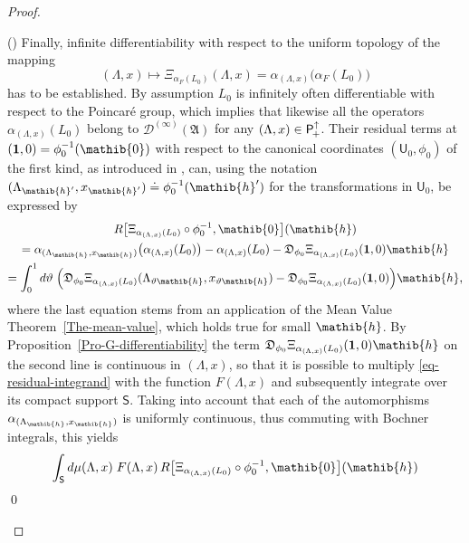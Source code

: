 \documentclass[11pt,twoside,openright]{report}
\theoremstyle{definition}
\theoremstyle{plain}
\theoremstyle{remark}
\theoremstyle{assumption}
\newcommand{\Afrak}{\mathfrak{A}}
\newcommand{\Dfrak}{\mathfrak{D}}
\newcommand{\zeroib}{\mathib{0}}
\newcommand{\hib}{\mathib{h}}
\newcommand{\Dscr}{\mathscr{D}}
\newcommand{\Ssf}{\mathsf{S}}
\newcommand{\Usf}{\mathsf{U}}
\newcommand{\unit}{\mathbf{1}}
\newcommand{\Poin}{\mathsf{P}_{\negthinspace +}^\uparrow}
\newcommand{\aLax}{\alpha_{( \Lambda , x )}}
\newcounter{proofitem}
\newenvironment{prooflist}{\begin{list}{(\roman{proofitem})}%
  {\usecounter{proofitem} \setlength{\topsep}{0ex}%
   \setlength{\parsep}{0.2ex} \setlength{\itemsep}{0.4ex}%
   \setlength{\leftmargin}{0em} \setlength{\itemindent}{0.5em}%
   \setlength{\listparindent}{1em}}}{\qed \end{list}}
\begin{document}
\begin{proof}
\begin{prooflist}
    Finally, infinite differentiability with respect to the uniform
    topology of the mapping
    \begin{equation*}
      ( \Lambda , x ) \mapsto \Xi_{\alpha_F ( L_0 )} ( \Lambda , x ) =
      \aLax \bigl( \alpha_F ( L_0 ) \bigr)
    \end{equation*}
    has to be established. By assumption $L_0$ is infinitely often
    differentiable with respect to the Poincar\'{e} group, which
    implies that likewise all the operators $\aLax ( L_0 )$ belong to
    $\Dscr^{( \infty )} ( \Afrak )$ for any $( \Lambda , x ) \in
    \Poin$. Their residual terms at $( \unit ,  0 ) = \phi_0^{-1} (
    \zeroib )$ with respect to the canonical coordinates $( \Usf_0 ,
    \phi_0 )$ of the first kind, as introduced in
    \cite[Section~2.10]{varadarajan:1984}, can, using the notation $(
    \Lambda_{\hib'} , x_{\hib'} ) \doteq \phi_0^{-1} ( \hib' )$ for
    the transformations in $\Usf_0$, be expressed by
    \begin{multline}
      \label{eq-residual-integrand}
      R \bigl[ \Xi_{\aLax ( L_0 )} \circ \phi_0^{-1} , \zeroib \bigr]
      ( \hib ) \\
      = \alpha_{( \Lambda_\hib , x_\hib )} \bigl( \aLax ( L_0 ) \bigr)
      - \aLax ( L_0 ) - \Dfrak_{\phi_0} \Xi_{\aLax ( L_0 )} ( \unit ,
      0 ) \hib \\ 
      = \int_0^1 d \vartheta \; \Bigl( \Dfrak_{\phi_0} \Xi_{\aLax (
      L_0 )} ( \Lambda_{\vartheta \hib} , x_{\vartheta \hib} ) -
      \Dfrak_{\phi_0} \Xi_{\aLax ( L_0 )} ( \unit , 0 ) \Bigr) \hib
      \text{,}
    \end{multline}
    where the last equation stems from an application of the Mean
    Value Theorem~\ref{The-mean-value}, which holds true for small
    $\hib$. By Proposition~\ref{Pro-G-differentiability} the term
    $\Dfrak_{\phi_0} \Xi_{\aLax ( L_0 )} ( \unit , 0 ) \hib$ on the
    second line is continuous in $( \Lambda , x )$, so that it is
    possible to multiply \eqref{eq-residual-integrand} with the
    function $F ( \Lambda , x )$ and subsequently integrate over its
    compact support $\Ssf$.  Taking into account that each of the
    automorphisms $\alpha_{( \Lambda_\hib , x_\hib )}$ is uniformly
    continuous, thus commuting with Bochner integrals, this yields
    \begin{multline}
      \label{eq-residual-integral}
      \int_\Ssf d \mu ( \Lambda , x ) \; F ( \Lambda , x ) \, R \bigl[
      \Xi_{\aLax ( L_0 )} \circ \phi_0^{-1} , \zeroib \bigr] ( \hib )
      \\

\end{multline}
\end{prooflist}
\end{proof}
\end{document}
